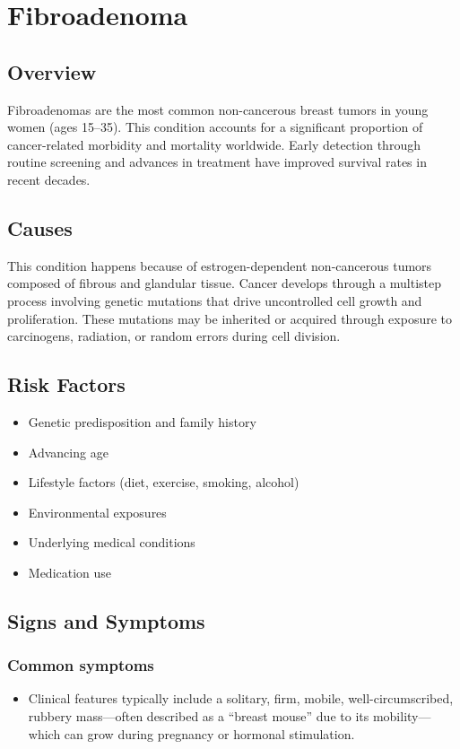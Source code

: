 \chapter{Fibroadenoma}
\label{sec:Fibroadenoma}

\section{Overview}
Fibroadenomas are the most common non-cancerous breast tumors in young women (ages 15--35). This condition accounts for a significant proportion of cancer-related morbidity and mortality worldwide. Early detection through routine screening and advances in treatment have improved survival rates in recent decades.
\section{Causes}
This condition happens because of estrogen-dependent non-cancerous tumors composed of fibrous and glandular tissue. Cancer develops through a multistep process involving genetic mutations that drive uncontrolled cell growth and proliferation. These mutations may be inherited or acquired through exposure to carcinogens, radiation, or random errors during cell division.    
\section{Risk Factors}

\begin{itemize}[noitemsep]
  \item Genetic predisposition and family history
  \item Advancing age
  \item Lifestyle factors (diet, exercise, smoking, alcohol)
  \item Environmental exposures
  \item Underlying medical conditions
  \item Medication use
\end{itemize}
\section{Signs and Symptoms}

\subsection{Common symptoms}
\begin{itemize}[noitemsep]
  \item Clinical features typically include a solitary, firm, mobile, well-circumscribed, rubbery mass---often described as a ``breast mouse'' due to its mobility---which can grow during pregnancy or hormonal stimulation. 
  \end{itemize}

